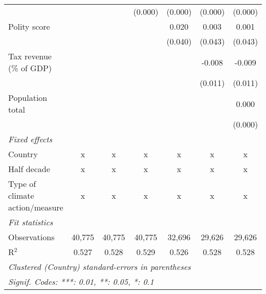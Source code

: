 \begin{tabular}{lcccccc}
                                                                               &               &               & (0.000)        & (0.000)        & (0.000)       & (0.000)\\   
   Polity score                                                                &               &               &                & 0.020          & 0.003         & 0.001\\   
                                                                               &               &               &                & (0.040)        & (0.043)       & (0.043)\\   
   Tax revenue (\% of GDP)                                                     &               &               &                &                & -0.008        & -0.009\\   
                                                                               &               &               &                &                & (0.011)       & (0.011)\\   
   Population total                                                            &               &               &                &                &               & 0.000\\   
                                                                               &               &               &                &                &               & (0.000)\\   
   \emph{Fixed effects}\\
   Country                                                                     & x             & x             & x              & x              & x             & x\\  
   Half decade                                                                 & x             & x             & x              & x              & x             & x\\  
   Type of climate action/measure                                              & x             & x             & x              & x              & x             & x\\  
   \midrule \emph{Fit statistics}\\
   Observations                                                                & 40,775        & 40,775        & 40,775         & 32,696         & 29,626        & 29,626\\  
   R$^2$                                                                       & 0.527         & 0.528         & 0.529          & 0.526          & 0.528         & 0.528\\  
   \midrule
   \multicolumn{7}{l}{\emph{Clustered (Country) standard-errors in parentheses}}\\
   \multicolumn{7}{l}{\emph{Signif. Codes: ***: 0.01, **: 0.05, *: 0.1}}\\
\end{tabular}
\par\endgroup


